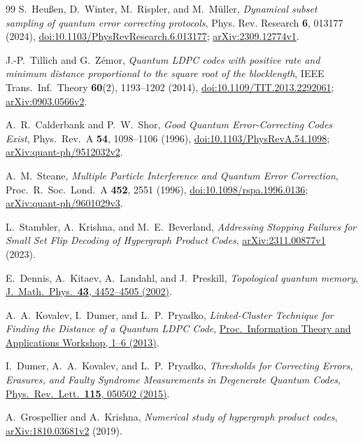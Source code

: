 \documentclass[10pt,twocolumn]{article}
\theoremstyle{definition}
\begin{document}
\begin{thebibliography}{99}
S.~Heu{\ss}en, D.~Winter, M.~Rispler, and M.~M{\"u}ller,
\emph{Dynamical subset sampling of quantum error correcting protocols},
Phys. Rev. Research \textbf{6}, 013177 (2024),
\href{https://doi.org/10.1103/PhysRevResearch.6.013177}{doi:10.1103/PhysRevResearch.6.013177};
\href{https://arxiv.org/abs/2309.12774v1}{arXiv:2309.12774v1}.

J.-P.~Tillich and G.~Z\'emor,
\emph{Quantum LDPC codes with positive rate and minimum distance
proportional to the square root of the blocklength},
IEEE Trans.\ Inf.\ Theory \textbf{60}(2), 1193--1202 (2014),
\href{https://doi.org/10.1109/TIT.2013.2292061}{doi:10.1109/TIT.2013.2292061};
\href{https://arxiv.org/abs/0903.0566v2}{arXiv:0903.0566v2}.

A.~R.~Calderbank and P.~W.~Shor,
\emph{Good Quantum Error-Correcting Codes Exist},
Phys.\ Rev.\ A \textbf{54}, 1098--1106 (1996),
\href{https://doi.org/10.1103/PhysRevA.54.1098}{doi:10.1103/PhysRevA.54.1098};
\href{https://arxiv.org/abs/quant-ph/9512032v2}{arXiv:quant-ph/9512032v2}.

A.~M.~Steane,
\emph{Multiple Particle Interference and Quantum Error Correction},
Proc.\ R.\ Soc.\ Lond.\ A \textbf{452}, 2551 (1996),
\href{https://doi.org/10.1098/rspa.1996.0136}{doi:10.1098/rspa.1996.0136};
\href{https://arxiv.org/abs/quant-ph/9601029v3}{arXiv:quant-ph/9601029v3}.

L.~Stambler, A.~Krishna, and M.~E.~Beverland,
\emph{Addressing Stopping Failures for Small Set Flip Decoding of Hypergraph Product Codes},
\href{https://arxiv.org/abs/2311.00877v1}{arXiv:2311.00877v1} (2023).

E.~Dennis, A.~Kitaev, A.~Landahl, and J.~Preskill,
\emph{Topological quantum memory},
\href{https://doi.org/10.1063/1.1499754}{J.\ Math.\ Phys.\ \textbf{43}, 4452--4505 (2002)}.

A.~A.~Kovalev, I.~Dumer, and L.~P.~Pryadko,
\emph{Linked-Cluster Technique for Finding the Distance of a Quantum LDPC Code},
\href{https://doi.org/10.1109/ITA.2013.6502967}{Proc.\ Information Theory and Applications Workshop, 1--6 (2013)}.

I.~Dumer, A.~A.~Kovalev, and L.~P.~Pryadko,
\emph{Thresholds for Correcting Errors, Erasures, and Faulty Syndrome Measurements in Degenerate Quantum Codes},
\href{https://doi.org/10.1103/PhysRevLett.115.050502}{Phys.\ Rev.\ Lett.\ \textbf{115}, 050502 (2015)}.

A.~Grospellier and A.~Krishna,
\emph{Numerical study of hypergraph product codes},
\href{https://arxiv.org/abs/1810.03681v2}{arXiv:1810.03681v2} (2019).


\end{thebibliography}
\end{document}
